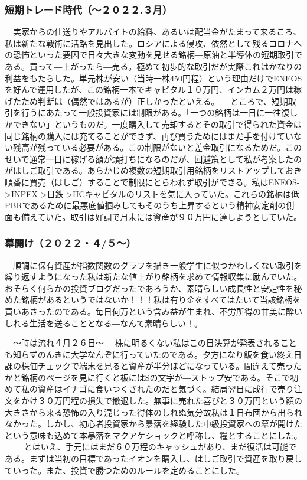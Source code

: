 \subsubsection{短期トレード時代（～２０２２.３月）}
　実家からの仕送りやアルバイトの給料、あるいは配当金がたまって来るころ、私は新たな戦術に活路を見出した。ロシアによる侵攻、依然として残るコロナへの恐怖といった要因で日々大きな変動を見せる銘柄―原油と半導体の短期取引である。買って―上がったら―売る。極めて初歩的な取引だが実際これはかなりの利益をもたらした。単元株が安い（当時一株450円程）という理由だけでENEOSを好んで運用したが、この銘柄一本でキャピタル１０万円、インカム２万円は稼げたため判断は（偶然ではあるが）正しかったといえる。
　ところで、短期取引を行うにあたって一般投資家には制限がある。「一つの銘柄は一日に一往復しかできない」というものだ。一度購入して売却するとその取引で得られた資金は同じ銘柄の購入には充てることができず、再び買うためにはまだ手を付けていない残高が残っている必要がある。この制限がないと差金取引になるためだ。このせいで通常一日に稼げる額が頭打ちになるのだが、回避策として私が考案したのがはしご取引である。あらかじめ複数の短期取引用銘柄をリストアップしておき順番に買売（はしご）することで制限にとらわれず取引ができる。私はENEOS->INPEX->日鉄->HCキャピタルのリストを気に入っていた。これらの銘柄は低PBRであるために最悪底値掴みしてもそのうち上昇するという精神安定剤の側面も備えていた。取引は好調で月末には資産が９０万円に達しようとしていた。

\subsubsection{幕開け（２０２２・４/５～）}
　順調に保有資産が指数関数のグラフを描き一般学生に似つかわしくない取引を繰り返すようになった私は新たな値上がり銘柄を求めて情報収集に励んでいた。おそらく何らかの投資ブログだったであろうか、素晴らしい成長性と安定性を秘めた銘柄があるというではないか！！！私は有り金をすべてはたいて当該銘柄を買いあさったのである。毎日何万という含み益が生まれ、不労所得の甘美に酔いしれる生活を送ることとなる―なんて素晴らしい！。


　～時は流れ４月２６日～
　株に明るくない私はこの日決算が発表されることも知らずのんきに大学なんぞに行っていたのである。夕方になり飯を食い終え日課の株価チェックで端末を見ると資産が半分ほどになっている。間違えて売ったかと銘柄のページを見に行くと板にはSの文字が―ストップ安である。そこで初めて私の資産はイナゴに食いつくされたのだと気づく。結局翌日に成行で売り注文をかけ３０万円程の損失で撤退した。無事に売れた喜びと３０万円という額の大きさから来る恐怖の入り混じった得体のしれぬ気分故私は１日布団から出られなかった。しかし、初心者投資家から暴落を経験した中級投資家への幕が開けたという意味も込めて本暴落をマクアケショックと呼称し、糧とすることにした。
　
　とはいえ、手元にはまだ６０万程のキャッシュがあり、まだ復活は可能である。まずは当初の目標であったイオンを購入し、はしご取引で資産を取り戻していった。また、投資で勝つためのルールを定めることにした。

